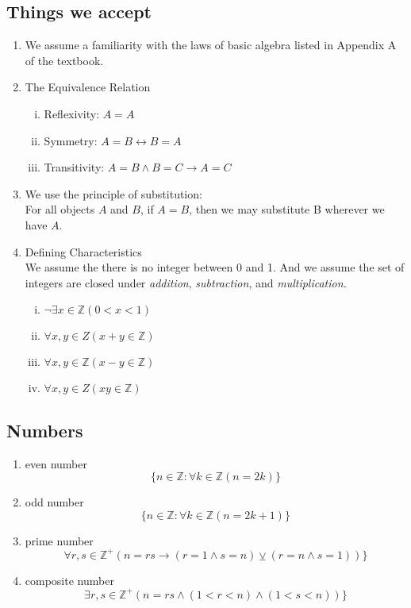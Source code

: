 \documentclass[12pt]{book}
\newcommand{\Z}{\mathbb{Z}}
\newcommand{\paren}[1]{\left( #1 \right)}
\begin{document}
\subsection{Things we accept}
\begin{enumerate}
    \item We assume a familiarity with the laws of basic algebra listed in Appendix A of the textbook.
    \item  The Equivalence Relation 
        \begin{enumerate}[i.]
            \item Reflexivity: $A=A$
            \item Symmetry: $A=B \leftrightarrow B=A$
            \item Transitivity: $A=B \wedge B=C \rightarrow A=C$
        \end{enumerate}
    \item We use the principle of substitution:\\
            For all objects $A$ and $B$, if $A=B$, then we may substitute B wherever we have $A$.
    \item Defining Characteristics\\
    We assume the there is no integer between 0 and 1. And we assume the set of integers are closed under \textit{addition}, \textit{subtraction}, and \textit{multiplication.}
        \begin{enumerate}[i.]
            \item $\neg \exists x \in \Z \paren{0<x<1}$
            \item $\forall x,y \in Z \paren{x+y  \in \Z}$
            \item $\forall x,y \in \Z \paren{x-y \in \Z}$
            \item $\forall x,y \in Z \paren{xy   \in \Z}$
        \end{enumerate}
\end{enumerate}

\subsection{Numbers}
\begin{enumerate}
    \item even number
        \[
        \{ n \in \Z : \forall k \in \Z \paren{n = 2k} \}
        \]
    \item odd number
        \[
        \{ n \in \Z : \forall k \in \Z \paren{n = 2k+1} \}
        \]
    \item prime number
        \[
        \forall r,s \in \Z ^+ \paren{n=rs \rightarrow \paren{r = 1 \wedge s = n}\veebar \paren{r=n \wedge s=1}}\}
        \]
    \item composite number
        \[
        \exists r,s \in \Z ^+ \paren{n=rs \wedge \paren{1<r<n} \wedge \paren{1<s<n}} \}
        \]
\end{enumerate}
\end{document}

